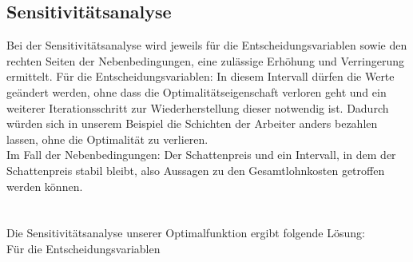 \subsection{Sensitivitätsanalyse}
Bei der Sensitivitätsanalyse wird jeweils für die Entscheidungsvariablen sowie den rechten Seiten der Nebenbedingungen, eine zulässige Erhöhung und Verringerung ermittelt. Für die Entscheidungsvariablen: In diesem Intervall dürfen die Werte geändert werden, ohne dass die Optimalitätseigenschaft verloren geht und ein weiterer Iterationsschritt zur Wiederherstellung dieser notwendig ist. Dadurch würden sich in unserem Beispiel die Schichten der Arbeiter anders bezahlen lassen, ohne die Optimalität zu verlieren.\\
Im Fall der Nebenbedingungen: Der Schattenpreis und ein Intervall, in dem der Schattenpreis stabil bleibt, also Aussagen zu den Gesamtlohnkosten getroffen werden können.\\
\\\\
Die Sensitivitätsanalyse unserer Optimalfunktion ergibt folgende Lösung:\\

Für die Entscheidungsvariablen\\

